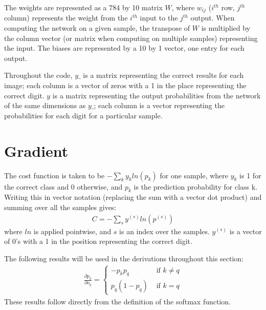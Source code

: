 \documentclass{article}
\begin{document}
   The weights are represented as a 784 by 10 matrix $W$, where $w_{ij}$ ($i^{th}$ row, $j^{th}$
   column) represents the weight from the $i^{th}$ input to the $j^{th}$ output.
   When computing the network on a given sample, the transpose of $W$ is multiplied
   by the column vector (or matrix when computing on multiple samples) representing the input.
   The biases are represented by a 10 by 1 vector, one entry for each output.

   Throughout the code, $y\_$ is a matrix representing the correct results for each image; each column is a
   vector of zeros with a 1 in the place representing the correct digit.
   $y$ is a matrix representing the output probabilities from the network of the same dimensions
   as $y\_$; each column is a vector representing the probabilities for each digit for a
   particular sample.

   \section{Gradient}
   The cost function is taken to be $- \sum_{k} y_k ln(p_k)$ for one sample, where $y_k$ is
   1 for the correct class and 0 otherwise, and $p_k$ is the prediction probability for class k.
   Writing this in vector notation (replacing the sum with a vector dot product) and
   summing over all the samples gives:
      \begin{equation*} \begin{split}
         C = - \sum_{s} y^{(s)} ln(p^{(s)})
      \end{split} \end{equation*}
   where $ln$ is applied pointwise, and $s$ is an index over the samples. $y^{(s)}$ is
   a vector of 0's with a 1 in the position representing the correct digit.

   The following results will be used in the derivations throughout this section:
      \begin{equation*} \begin{split}
        \frac{ \partial p_k}{ \partial o_q } =
            \begin{cases}
               -p_k p_q       & \textrm{ if } k \neq q \\
               p_q (1 - p_q)  & \textrm{ if } k = q
            \end{cases}
      \end{split} \end{equation*}
   These results follow directly from the definition of the softmax function.
\end{document}
